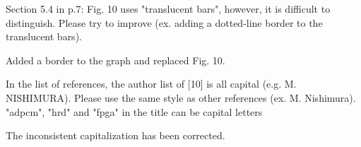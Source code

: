 \documentclass[a4j]{jsarticle}
\begin{document}
\vspace{0.3cm}
\begin{screen}
Section 5.4 in p.7: Fig. 10 uses "translucent bars", however, it is difficult to distinguish. Please try to improve (ex. adding a dotted-line border to the translucent bars).
\end{screen}
Added a border to the graph and replaced Fig. 10.

\vspace{0.3cm}
\begin{screen}
In the list of references, the author list of [10] is all capital (e.g. M. NISHIMURA). Please use the same style as other references (ex. M. Nishimura). "adpcm", "hrd" and
"fpga" in the title can be capital letters
\end{screen}
The inconsistent capitalization has been corrected.
\end{document}
